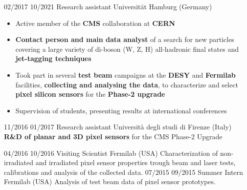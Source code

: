     \position
      {02/2017 \textemdash{} 10/2021}
      {Research assistant}
      {Universit\"{a}t Hamburg (Germany)}
      {\begin{itemize}
\item Active member of the {\bf CMS} collaboration at {\bf CERN}
\item {\bf Contact person and main data analyst} of a search for new particles covering a large variety of di-boson (W, Z, H) all-hadronic final states and {\bf  jet-tagging techniques}
\item Took part in several {\bf test beam} campaigns at the {\bf DESY} and {\bf Fermilab} facilities, {\bf collecting and analysing the data}, to characterize and select {\bf pixel silicon sensors} for the {\bf Phase-2 upgrade}
\item Supervision of students, presenting results at international conferences
\end{itemize}
}
    \position
      {11/2016 \textemdash{} 01/2017}
      {Research assistant}
      {Universit\`a degli studi di Firenze (Italy)}
      {{\bf R\&D of planar and 3D pixel sensors} for the CMS Phase-2  Upgrade}

    \position
      {04/2016 \textemdash{} 10/2016}
      {Visiting Scientist}
      {Fermilab (USA)}
      {Characterization of non-irradiated and irradiated pixel sensor properties trough beam and laser tests, calibrations and analysis of the collected data.}
    \position
      {07/2015 \textemdash{} 09/2015}
      {Summer Intern}
      {Fermilab (USA)}
      {Analysis of test beam data of pixel sensor prototypes.}
\fi
